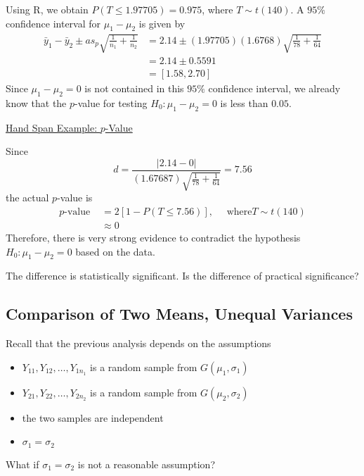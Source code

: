 \begin{exbox}
    \begin{example}
        Using R, we obtain $ P(T\leqslant 1.97705)=0.975 $, where $ T\sim t(140) $.
        A $ 95\% $ confidence interval for $ \mu_1-\mu_2 $ is given by
        \[\begin{aligned}
                \bar{y}_{1}-\bar{y}_{2} \pm a s_{p} \sqrt{\frac{1}{n_{1}}+\frac{1}{n_{2}}} & =2.14 \pm(1.97705)(1.6768) \sqrt{\frac{1}{78}+\frac{1}{64}} \\
                                                                                           & =2.14 \pm 0.5591                                            \\
                                                                                           & =[1.58,2.70]
            \end{aligned}\]
        Since $ \mu_1-\mu_2=0 $ is not contained in this $ 95\% $ confidence interval, we already
        know that the $ p $-value for testing $ H_0:\mu_1-\mu_2=0 $ is less than $ 0.05 $.

        \underline{Hand Span Example: $ p $-Value}

        Since
        \[d=\frac{|2.14-0|}{(1.67687) \sqrt{\frac{1}{78}+\frac{1}{64}}}=7.56\]
        the actual $ p $-value is
        \[\begin{aligned}
                p \text{-value } & =2[1-P(T \leq 7.56)], \quad \text{ where} T \sim t(140) \\
                                 & \approx 0
            \end{aligned}\]
        Therefore, there is very strong evidence to contradict the hypothesis $ H_0:\mu_1-\mu_2=0 $
        based on the data.

        The difference is statistically significant. Is the difference of practical significance?
    \end{example}
\end{exbox}

\subsection{Comparison of Two Means, Unequal Variances}
Recall that the previous analysis depends on the assumptions
\begin{itemize}
    \item $ Y_{11},Y_{12},\ldots ,Y_{1n_1} $ is a random sample from $ G(\mu_1,\sigma_1) $
    \item $ Y_{21},Y_{22},\ldots ,Y_{2n_2} $ is a random sample from $ G(\mu_2,\sigma_2) $
    \item the two samples are independent
    \item $ \sigma_1=\sigma_2 $
\end{itemize}
What if $ \sigma_1=\sigma_2 $ is not a reasonable assumption?

